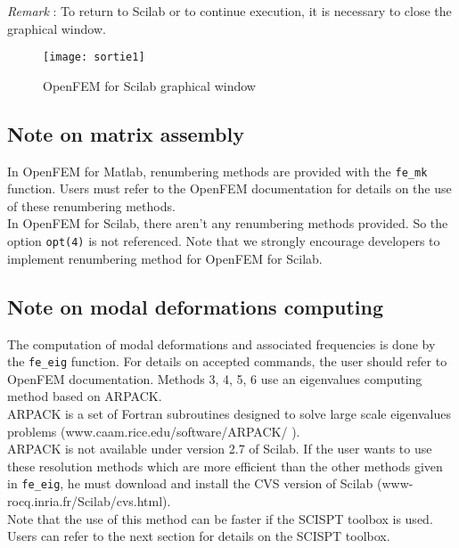 $ $\\
\emph{Remark} : To return to Scilab or to continue execution, it is necessary to close the graphical window.
\begin{figure}[h]
\begin{center}
\texttt{[image: sortie1]}
\caption{OpenFEM for Scilab graphical window}
\label{sortie1}
\end{center}
\end{figure}

\subsection{Note on matrix assembly}
In OpenFEM for Matlab, renumbering methods are provided with the \verb+fe_mk+ function. Users must refer to the OpenFEM documentation for details on the use of these renumbering methods.\\
In OpenFEM for Scilab, there aren't any renumbering methods provided. So the option \verb+opt(4)+ is not referenced. Note that we strongly encourage developers to implement renumbering method for OpenFEM for Scilab. 

\subsection{Note on modal deformations computing}
The computation of modal deformations and associated frequencies is done by the \verb+fe_eig+ function. For details on accepted commands, the user should refer to OpenFEM documentation. Methods 3, 4, 5, 6 use an eigenvalues computing method based on ARPACK.\\
ARPACK is a set of Fortran subroutines designed to solve large scale eigenvalues problems (www.caam.rice.edu/software/ARPACK/ ).\\
ARPACK is not available under version 2.7 of Scilab. If the user wants to use these resolution methods which are more efficient than the other methods given in \verb+fe_eig+, he must download and install the CVS version of Scilab (www-rocq.inria.fr/Scilab/cvs.html).\\
Note that the use of this method can be faster if the SCISPT toolbox is used. Users can refer to the next section for details on the SCISPT toolbox.

